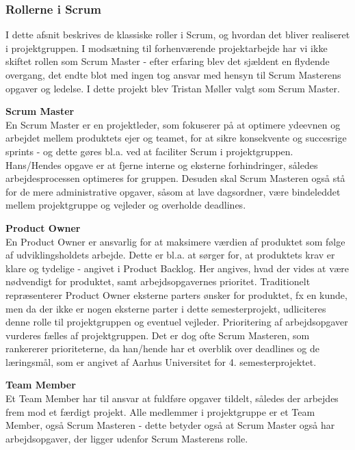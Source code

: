 \documentclass[a4paper,12pt,fleqn,oneside]{article}
\begin{document}
\subsubsection{Rollerne i Scrum}
I dette afsnit beskrives de klassiske roller i Scrum, og hvordan det bliver realiseret i projektgruppen. I modsætning til forhenværende projektarbejde har vi ikke skiftet rollen som Scrum Master - efter erfaring blev det sjældent en flydende overgang, det endte blot med ingen tog ansvar med hensyn til Scrum Masterens opgaver og ledelse. I dette projekt blev Tristan Møller valgt som Scrum Master.

\textbf{Scrum Master} \\
En Scrum Master er en projektleder, som fokuserer på at optimere ydeevnen og arbejdet mellem produktets ejer og teamet, for at sikre konsekvente og succesrige sprints - og dette gøres bl.a. ved at faciliter Scrum i projektgruppen. Hans/Hendes opgave er at fjerne interne og eksterne forhindringer, således arbejdesprocessen optimeres for gruppen. Desuden skal Scrum Masteren også stå for de mere administrative opgaver, såsom at lave dagsordner, være bindeleddet mellem projektgruppe og vejleder og overholde deadlines. 

\textbf{Product Owner} \\
En Product Owner er ansvarlig for at maksimere værdien af produktet som følge af udviklingsholdets arbejde. Dette er bl.a. at sørger for, at produktets krav er klare og tydelige - angivet i Product Backlog. Her angives, hvad der vides at være nødvendigt for produktet, samt arbejdsopgavernes prioritet. Traditionelt repræsenterer Product Owner eksterne parters ønsker for produktet, fx en kunde, men da der ikke er nogen eksterne parter i dette semesterprojekt, udliciteres denne rolle til projektgruppen og eventuel vejleder. Prioritering af arbejdsopgaver vurderes fælles af projektgruppen. Det er dog ofte Scrum Masteren, som rankererer prioriteterne, da han/hende har et overblik over deadlines og de læringsmål, som er angivet af Aarhus Universitet for 4. semesterprojektet. 

\textbf{Team Member} \\
Et Team Member har til ansvar at fuldføre opgaver tildelt, således der arbejdes frem mod et færdigt projekt. Alle medlemmer i projektgruppe er et Team Member, også Scrum Masteren - dette betyder også at Scrum Master også har arbejdsopgaver, der ligger udenfor Scrum Masterens rolle. 
\end{document}
